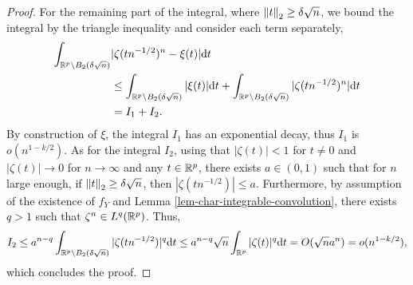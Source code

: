 \begin{proof}
    For the remaining part of the integral, where $\norm{t}_2 \geq \delta \sqrt{n}$, we bound the integral by the triangle inequality and consider each term separately,
    \begin{align*}
        \int_{\Rp \setminus B_2(\delta\sqrt{n})} &|\zeta(tn^{-1/2})^n - \xi(t)| \d t \\
        &\leq \int_{\Rp \setminus B_2(\delta\sqrt{n})} |\xi(t)| \d t + \int_{\Rp \setminus B_2(\delta\sqrt{n})} |\zeta(tn^{-1/2})^n| \d t\\
        &= I_1 + I_2.
    \end{align*}
    By construction of $\xi$, the integral $I_1$ has an exponential decay, thus $I_1$ is $o(n^{1 - k/2})$. As for the integral $I_2$, using that $|\zeta(t)| < 1$ for $t \neq 0$ and $|\zeta(t)| \rightarrow 0$ for $n \rightarrow \infty$ and any $t \in \Rp$, there exists $a \in (0, 1)$ such that for $n$ large enough, if $\norm{t}_2 \geq \delta\sqrt{n}$, then $|\zeta(tn^{-1/2})| \leq a$. Furthermore, by assumption of the existence of $f_Y$ and Lemma \ref{lem-char-integrable-convolution}, there exists $q > 1$ such that $\zeta^n \in L^q(\Rp)$. Thus,
    \begin{equation*}
        I_2
        \leq a^{n-q} \int_{\Rp \setminus B_2(\delta\sqrt{n})} |\zeta(tn^{-1/2})|^q \d t 
        \leq a^{n-q}\sqrt{n}\intRp{t}{|\zeta(t)|^q} 
        = O(\sqrt{n}a^n) = o(n^{1-k/2}),
    \end{equation*}
    which concludes the proof.
\end{proof}